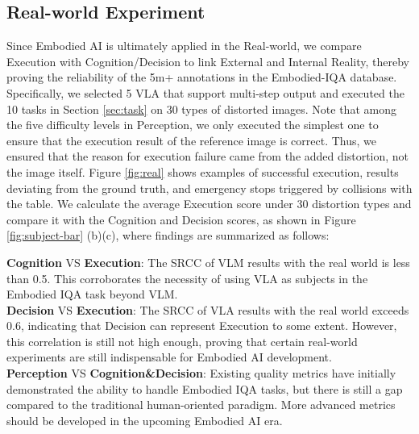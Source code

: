 \documentclass{article}
\newcommand{\CLA}[1]{{\color[HTML]{4472c4} \textbf{#1}}}
\begin{document}
\subsection{Real-world Experiment}

Since Embodied AI is ultimately applied in the Real-world, we compare Execution with Cognition/Decision to link External and Internal Reality, thereby proving the reliability of the 5m+ annotations in the Embodied-IQA database. Specifically, we selected 5 VLA that support multi-step output and executed the 10 tasks in Section \ref{sec:task} on 30 types of distorted images. Note that among the five difficulty levels in Perception, we only executed the simplest one to ensure that the execution result of the reference image is correct. Thus, we ensured that the reason for execution failure came from the added distortion, not the image itself. Figure \ref{fig:real} shows examples of successful execution, results deviating from the ground truth, and emergency stops triggered by collisions with the table. We calculate the average Execution score under 30 distortion types and compare it with the Cognition and Decision scores, as shown in Figure \ref{fig:subject-bar} (b)(c), where findings are summarized as follows:

\CLA{Cognition} VS \CLA{Execution}: The SRCC of VLM results with the real world is less than 0.5. This corroborates the necessity of using VLA as subjects in the Embodied IQA task beyond VLM.
\\
\CLA{Decision} VS \CLA{Execution}: The SRCC of VLA results with the real world exceeds 0.6, indicating that Decision can represent Execution to some extent. However, this correlation is still not high enough, proving that certain real-world experiments are still indispensable for Embodied AI development. 
\\
\CLA{Perception}  VS \CLA{Cognition\&Decision}: Existing quality metrics have initially demonstrated the ability to handle Embodied IQA tasks, but there is still a gap compared to the traditional human-oriented paradigm. More advanced metrics should be developed in the upcoming Embodied AI era.
\end{document}
